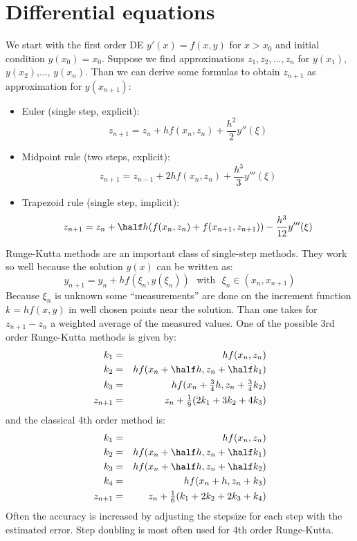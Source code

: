 \section{Differential equations}
We start with the first order DE $y'(x)=f(x,y)$ for $x>x_0$ and initial condition
$y(x_0)=x_0$. Suppose we find approximations $z_1,z_2,...,z_n$ for $y(x_1)$,
$y(x_2)$,..., $y(x_n)$. Than we can derive some formulas to obtain
$z_{n+1}$ as approximation for $y(x_{n+1})$:
\begin{itemize}
\item Euler (single step, explicit):
\[
z_{n+1}=z_n+hf(x_n,z_n)+\frac{h^2}{2}y''(\xi)
\]
\item Midpoint rule (two steps, explicit):
\[
z_{n+1}=z_{n-1}+2hf(x_n,z_n)+\frac{h^3}{3}y'''(\xi)
\]
\item Trapezoid rule (single step, implicit):
\[
z_{n+1}=z_n+\half h(f(x_n,z_n)+f(x_{n+1},z_{n+1}))-\frac{h^3}{12}y'''(\xi)
\]
\end{itemize}
Runge-Kutta methods are an important class of single-step methods. They
work so well because the solution $y(x)$ can be written as:
\[
y_{n+1}=y_n+hf(\xi_n,y(\xi_n))~~~\mbox{with}~~~\xi_n\in(x_n,x_{n+1})
\]
Because $\xi_n$ is unknown some ``measurements'' are done on the
increment function $k=hf(x,y)$ in well chosen points near the solution.
Than one takes for $z_{n+1}-z_n$ a weighted average of the measured values.
One of the possible 3rd order Runge-Kutta methods is given by:
\begin{eqnarray*}
k_1&=&hf(x_n,z_n)\\
k_2&=&hf(x_n+\half h,z_n+\half k_1)\\
k_3&=&hf(x_n+\mbox{$\frac{3}{4}$}h,z_n+\mbox{$\frac{3}{4}$}k_2)\\
z_{n+1}&=&z_n+\mbox{$\frac{1}{9}$}(2k_1+3k_2+4k_3)
\end{eqnarray*}
and the classical 4th order method is:
\begin{eqnarray*}
k_1&=&hf(x_n,z_n)\\
k_2&=&hf(x_n+\half h,z_n+\half k_1)\\
k_3&=&hf(x_n+\half h,z_n+\half k_2)\\
k_4&=&hf(x_n+h,z_n+k_3)\\
z_{n+1}&=&z_n+\mbox{$\frac{1}{6}$}(k_1+2k_2+2k_3+k_4)
\end{eqnarray*}
Often the accuracy is increased by adjusting the stepsize for each step with
the estimated error. Step doubling is most often used for 4th order Runge-Kutta.

